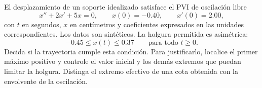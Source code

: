 El desplazamiento de un soporte idealizado satisface el PVI de oscilación libre
\[
x''+2x'+5x=0,\qquad x(0)=-0.40,\qquad x'(0)=2.00,
\]
con \(t\) en segundos, \(x\) en centímetros y coeficientes expresados en las unidades correspondientes. Los datos son sintéticos. La holgura permitida es asimétrica:
\[
-0.45\le x(t)\le0.37\qquad\text{para todo }t\ge0.
\]
Decida si la trayectoria cumple esta condición. Para justificarlo, localice el primer máximo positivo y controle el valor inicial y los demás extremos que puedan limitar la holgura. Distinga el extremo efectivo de una cota obtenida con la envolvente de la oscilación.
